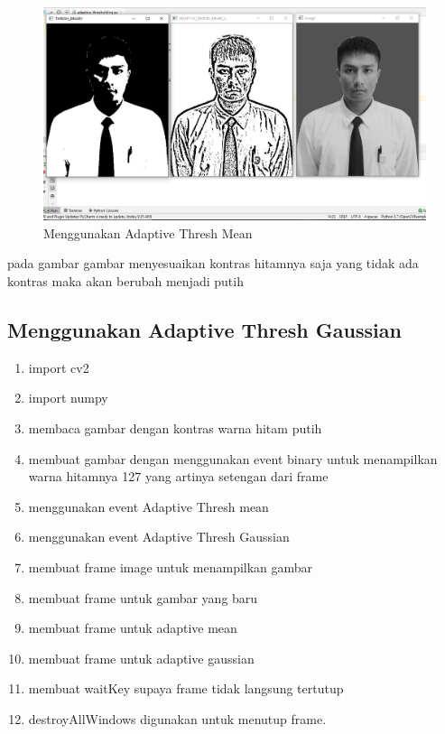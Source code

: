 \newpage
\begin{figure}[ht]
\centering
\includegraphics[scale=0.38]{figures/2,44.jpg}
\caption{Menggunakan Adaptive Thresh Mean}
\label{contoh}
\end{figure}
pada gambar gambar menyesuaikan kontras hitamnya saja yang tidak ada kontras maka akan berubah menjadi putih







\newpage
\subsection{Menggunakan Adaptive Thresh Gaussian}

\begin{enumerate}
	\item import cv2
	\item import numpy
	\item membaca gambar dengan kontras warna hitam putih
	\item membuat gambar dengan menggunakan event binary untuk menampilkan warna hitamnya 127 yang artinya setengan dari frame
	\item menggunakan event Adaptive Thresh mean
	\item menggunakan event Adaptive Thresh Gaussian
	\item membuat frame image untuk menampilkan gambar
	\item membuat frame untuk gambar yang baru
	\item membuat frame untuk adaptive mean
	\item membuat frame untuk adaptive gaussian
	\item membuat waitKey supaya frame tidak langsung tertutup
	\item destroyAllWindows digunakan untuk menutup frame.
\end{enumerate}

